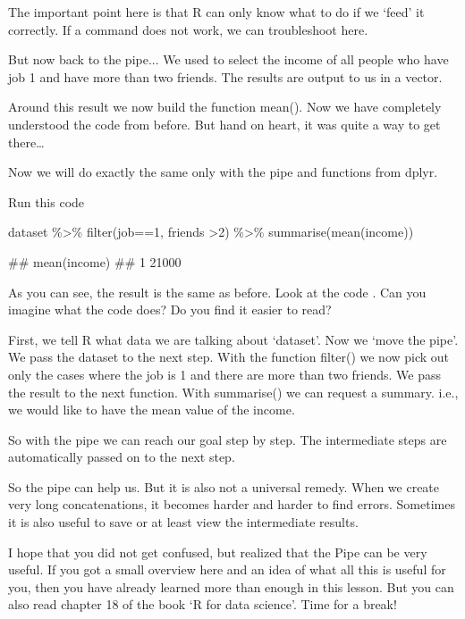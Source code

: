 The important point here is that R can only know what to do if we ‘feed’ it correctly. If a command does not work, we can troubleshoot here.

But now back to the pipe... We used  to select the income of all people who have job 1 and have more than two friends. The results are output to us in a vector.

Around this result we now build the function mean(). Now we have completely understood the code from before. But hand on heart, it was quite a way to get there…

Now we will do exactly the same only with the pipe and functions from dplyr.

Run this code 

\begin{rblock1}
	dataset \%>\% filter(job==1, friends >2) \%>\% summarise(mean(income))
	
	##   mean(income)
	## 1        21000
\end{rblock1}

As you can see, the result is the same as before. Look at the code . Can you imagine what the code does? Do you find it easier to read?

First, we tell R what data we are talking about ‘dataset’. Now we ‘move the pipe’. We pass the dataset to the next step. With the function filter() we now pick out only the cases where the job is 1 and there are more than two friends. We pass the result to the next function. With summarise() we can request a summary. i.e., we would like to have the mean value of the income.

So with the pipe we can reach our goal step by step. The intermediate steps are automatically passed on to the next step.

So the pipe can help us. But it is also not a universal remedy. When we create very long concatenations, it becomes harder and harder to find errors. Sometimes it is also useful to save or at least view the intermediate results.

I hope that you did not get confused, but realized that the Pipe can be very useful. If you got a small overview here and an idea of what all this is useful for you, then you have already learned more than enough in this lesson. But you can also read chapter 18 of the book ‘R for data science’. Time for a break!


